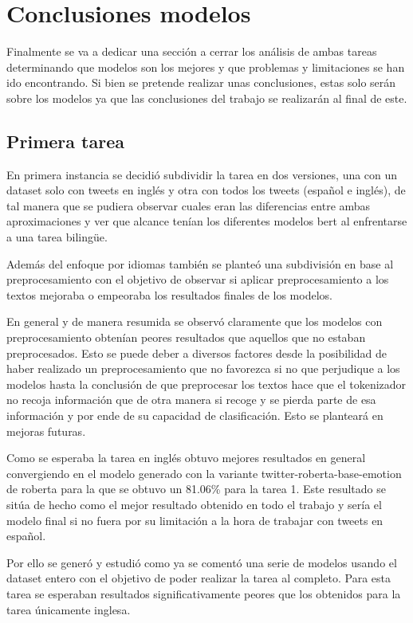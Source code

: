 \section{Conclusiones modelos}

Finalmente se va a dedicar una sección a cerrar los análisis de ambas tareas determinando que modelos son los mejores y que problemas y limitaciones se han ido encontrando. Si bien se pretende realizar unas conclusiones, estas solo serán sobre los modelos ya que las conclusiones del trabajo se realizarán al final de este.


\subsection{Primera tarea}

En primera instancia se decidió subdividir la tarea en dos versiones, una con un dataset solo con tweets en inglés y otra con todos los tweets (español e inglés), de tal manera que se pudiera observar cuales eran las diferencias entre ambas aproximaciones y ver que alcance tenían los diferentes modelos bert al enfrentarse a una tarea bilingüe.

Además del enfoque por idiomas también se planteó una subdivisión en base al preprocesamiento con el objetivo de observar si aplicar preprocesamiento a los textos mejoraba o empeoraba los resultados finales de los modelos. 

En general y de manera resumida se observó claramente que los modelos con preprocesamiento obtenían peores resultados que aquellos que no estaban preprocesados. Esto se puede deber a diversos factores desde la posibilidad de haber realizado un preprocesamiento que no favorezca si no que perjudique a los modelos hasta la conclusión de que preprocesar los textos hace que el tokenizador no recoja información que de otra manera si recoge y se pierda parte de esa información y por ende de su capacidad de clasificación. Esto se planteará en mejoras futuras.

Como se esperaba la tarea en inglés obtuvo mejores resultados en general convergiendo en el modelo generado con la variante twitter-roberta-base-emotion de roberta para la que se obtuvo un 81.06\% para la tarea 1. Este resultado se sitúa de hecho como el mejor resultado obtenido en todo el trabajo y sería el modelo final si no fuera por su limitación a la hora de trabajar con tweets en español.

Por ello se generó y estudió como ya se comentó una serie de modelos usando el dataset entero con el objetivo de poder realizar la tarea al completo. Para esta tarea se esperaban resultados significativamente peores que los obtenidos para la tarea únicamente inglesa.

